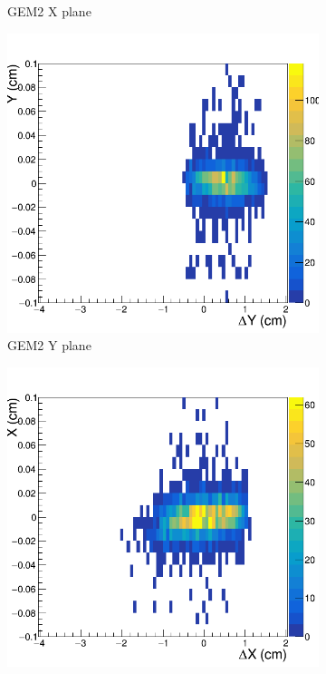 \begin{figure}[h!]
\begin{subfigure}[l]{.45\textwidth}
   \caption{GEM2 X plane}
   \label{fig:GEM2X_before}
 \end{subfigure}
 \begin{subfigure}[r]{.45\textwidth}
   \centering
   \includegraphics[width=\linewidth]{thesis_figures/alignment/Run_3211_T/G2Y_after_millepede_U.png}
   \caption{GEM2 Y plane}
   \label{fig:GEM2Y_before}
 \end{subfigure}
 \begin{subfigure}[l]{.45\textwidth}
   \centering
   \includegraphics[width=\linewidth]{thesis_figures/alignment/Run_3211_T/G4X_after_millepede_U.png}


\end{subfigure}
\end{figure}
